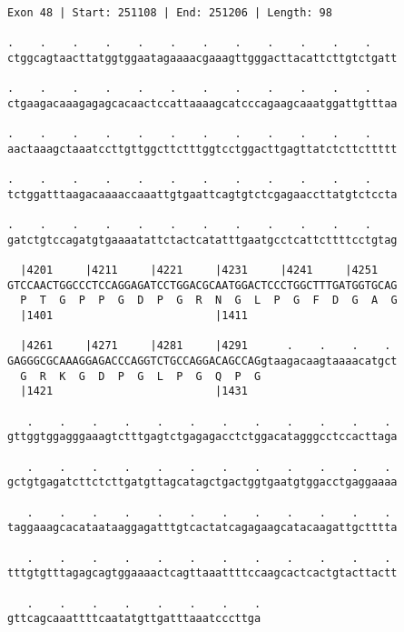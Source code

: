 \documentclass{article}
\begin{document}
\begin{Verbatim}
Exon 48 | Start: 251108 | End: 251206 | Length: 98
 
.    .    .    .    .    .    .    .    .    .    .    .    
ctggcagtaacttatggtggaatagaaaacgaaagttgggacttacattcttgtctgatt
  
.    .    .    .    .    .    .    .    .    .    .    .    
ctgaagacaaagagagcacaactccattaaaagcatcccagaagcaaatggattgtttaa
  
.    .    .    .    .    .    .    .    .    .    .    .    
aactaaagctaaatccttgttggcttctttggtcctggacttgagttatctcttcttttt
  
.    .    .    .    .    .    .    .    .    .    .    .    
tctggatttaagacaaaaccaaattgtgaattcagtgtctcgagaaccttatgtctccta
  
.    .    .    .    .    .    .    .    .    .    .    .    
gatctgtccagatgtgaaaatattctactcatatttgaatgcctcattcttttcctgtag
  
  |4201     |4211     |4221     |4231     |4241     |4251   
GTCCAACTGGCCCTCCAGGAGATCCTGGACGCAATGGACTCCCTGGCTTTGATGGTGCAG
  P  T  G  P  P  G  D  P  G  R  N  G  L  P  G  F  D  G  A  G
  |1401                         |1411                       
  
  |4261     |4271     |4281     |4291      .    .    .    . 
GAGGGCGCAAAGGAGACCCAGGTCTGCCAGGACAGCCAGgtaagacaagtaaaacatgct
  G  R  K  G  D  P  G  L  P  G  Q  P  G                     
  |1421                         |1431                       
  
   .    .    .    .    .    .    .    .    .    .    .    . 
gttggtggagggaaagtctttgagtctgagagacctctggacatagggcctccacttaga
  
   .    .    .    .    .    .    .    .    .    .    .    . 
gctgtgagatcttctcttgatgttagcatagctgactggtgaatgtggacctgaggaaaa
  
   .    .    .    .    .    .    .    .    .    .    .    . 
taggaaagcacataataaggagatttgtcactatcagagaagcatacaagattgctttta
  
   .    .    .    .    .    .    .    .    .    .    .    . 
tttgtgtttagagcagtggaaaactcagttaaattttccaagcactcactgtacttactt
  
   .    .    .    .    .    .    .    .
gttcagcaaattttcaatatgttgatttaaatcccttga
\end{Verbatim}
\newpage
\end{document}
